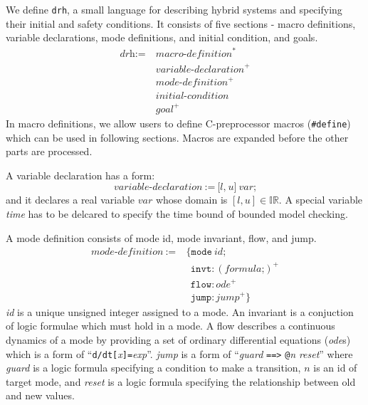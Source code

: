 We define \texttt{drh}, a small language for describing hybrid systems
and specifying their initial and safety conditions. It consists of
five sections - macro definitions, variable declarations, mode
definitions, and initial condition, and goals.
\begin{align*}
  \textit{drh} := \ & \textit{macro-definition}^*\\
                  & \textit{variable-declaration}^+\\
                  & \textit{mode-definition}^+\\
                  & \textit{initial-condition}\\
                  & \textit{goal}^+
\end{align*}
In macro definitions, we allow users to define C-preprocessor macros
(\texttt{\#define}) which can be used in following sections. Macros
are expanded before the other parts are processed.

A variable declaration has a form:
\[
\textit{variable-declaration} \ := \ \texttt{[}
                                     \textit{l}
                                     \texttt{,}
                                     \ \textit{u}
                                     \texttt{]}
                                     \ \textit{var}
                                     \texttt{;}
\]
and it declares a real variable $var$ whose domain is $[l, u] \in
\mathbb{IR}$. A special variable \textit{time} has to be delcared to
specify the time bound of bounded model checking.

A mode definition consists of mode id, mode invariant, flow, and jump.
\begin{align*}
  \textit{mode-definition} \ := & \ \texttt{\{}
                                    \texttt{mode} \ \textit{id}\texttt{;}\\
                           & \ \ \  \texttt{invt}:(\textit{formula} \texttt{;})^+\\
                           & \ \ \  \texttt{flow}:\textit{ode}^+\\
                           & \ \ \ \texttt{jump}:\textit{jump}^+ \texttt{\}}
\end{align*}
\textit{id} is a unique unsigned integer assigned to a mode. An
invariant is a conjuction of logic formulae which must hold in a mode.
A flow describes a continuous dynamics of a mode by providing a set of
ordinary differential equations (\textit{ode}s) which is a form of
``\texttt{d/dt[}\textit{x}\texttt{]=}\textit{exp}''. \textit{jump} is
a form of ``\textit{guard} \texttt{==>} \texttt{@}\textit{n}
\textit{reset}'' where \textit{guard} is a logic formula specifying a
condition to make a transition, $n$ is an id of target mode, and
\textit{reset} is a logic formula specifying the relationship between
old and new values.


